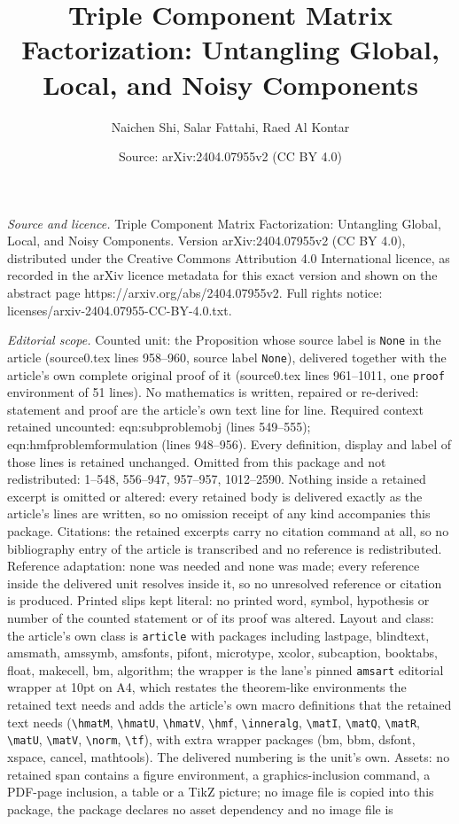 \documentclass[10pt,a4paper]{amsart}
\title[Triple Component Matrix Factorization: Untangling Global, Lo]{Triple Component Matrix Factorization: Untangling Global, Local, and Noisy Components}
\author{Naichen Shi, Salar Fattahi, Raed Al Kontar}
\date{Source: arXiv:2404.07955v2 (CC BY 4.0)}
\begin{document}
\maketitle

\noindent\emph{Source and licence.} Triple Component Matrix Factorization: Untangling Global, Local, and Noisy Components. Version arXiv:2404.07955v2 (CC BY 4.0), distributed under the Creative Commons Attribution 4.0 International licence, as recorded in the arXiv licence metadata for this exact version and shown on the abstract page https://arxiv.org/abs/2404.07955v2. Full rights notice: licenses/arxiv-2404.07955-CC-BY-4.0.txt.\par\smallskip

\noindent\textit{Editorial scope.} Counted unit: the Proposition whose source label is \texttt{None} in the article (source0.tex lines 958--960, source label \texttt{None}), delivered together with the article's own complete original proof of it (source0.tex lines 961--1011, one \texttt{proof} environment of 51 lines). No mathematics is written, repaired or re-derived: statement and proof are the article's own text line for line. Required context retained uncounted: eqn:subproblemobj (lines 549--555); eqn:hmfproblemformulation (lines 948--956). Every definition, display and label of those lines is retained unchanged. Omitted from this package and not redistributed: 1--548, 556--947, 957--957, 1012--2590. Nothing inside a retained excerpt is omitted or altered: every retained body is delivered exactly as the article's lines are written, so no omission receipt of any kind accompanies this package. Citations: the retained excerpts carry no citation command at all, so no bibliography entry of the article is transcribed and no reference is redistributed. Reference adaptation: none was needed and none was made; every reference inside the delivered unit resolves inside it, so no unresolved reference or citation is produced. Printed slips kept literal: no printed word, symbol, hypothesis or number of the counted statement or of its proof was altered. Layout and class: the article's own class is \texttt{article} with packages including lastpage, blindtext, amsmath, amssymb, amsfonts, pifont, microtype, xcolor, subcaption, booktabs, float, makecell, bm, algorithm; the wrapper is the lane's pinned \texttt{amsart} editorial wrapper at 10pt on A4, which restates the theorem-like environments the retained text needs and adds the article's own macro definitions that the retained text needs (\texttt{\textbackslash hmatM}, \texttt{\textbackslash hmatU}, \texttt{\textbackslash hmatV}, \texttt{\textbackslash hmf}, \texttt{\textbackslash inneralg}, \texttt{\textbackslash matI}, \texttt{\textbackslash matQ}, \texttt{\textbackslash matR}, \texttt{\textbackslash matU}, \texttt{\textbackslash matV}, \texttt{\textbackslash norm}, \texttt{\textbackslash tf}), with extra wrapper packages (bm, bbm, dsfont, xspace, cancel, mathtools). The delivered numbering is the unit's own. Assets: no retained span contains a figure environment, a graphics-inclusion command, a PDF-page inclusion, a table or a TikZ picture; no image file is copied into this package, the package declares no asset dependency and no image file is 
\end{document}
